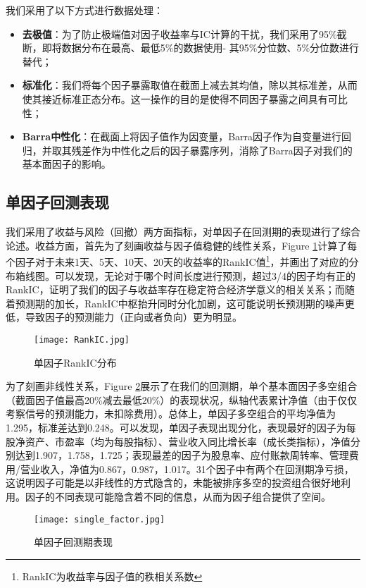 \documentclass[11pt]{article}
\begin{document}
我们采用了以下方式进行数据处理：
\begin{itemize}
    \item \textbf{去极值}：为了防止极端值对因子收益率与IC计算的干扰，我们采用了95\%截断，即将数据分布在最高、最低5\%的数据使用-
    其95\%分位数、5\%分位数进行替代；
    \item \textbf{标准化}：我们将每个因子暴露取值在截面上减去其均值，除以其标准差，从而使其接近标准正态分布。这一操作的目的是使得不同因子暴露之间具有可比性；
    \item \textbf{Barra中性化}：在截面上将因子值作为因变量，Barra因子作为自变量进行回归，并取其残差作为中性化之后的因子暴露序列，消除了Barra因子对我们的基本面因子的影响。
\end{itemize}


\subsection{单因子回测表现}

我们采用了收益与风险（回撤）两方面指标，对单因子在回测期的表现进行了综合论述。收益方面，首先为了刻画收益与因子值稳健的线性关系，Figure \ref{fig:rankic}计算了每个因子对于未来1天、5天、10天、20天的收益率的RankIC值\footnote{RankIC为收益率与因子值的秩相关系数}，并画出了对应的分布箱线图。可以发现，无论对于哪个时间长度进行预测，超过3/4的因子均有正的RankIC，证明了我们的因子与收益率存在稳定符合经济学意义的相关关系；而随着预测期的加长，RankIC中枢抬升同时分化加剧，这可能说明长预测期的噪声更低，导致因子的预测能力（正向或者负向）更为明显。
\begin{figure}[H]
    \centering
    \texttt{[image: RankIC.jpg]}
    \caption{单因子RankIC分布}
    \label{fig:rankic}
\end{figure} 

为了刻画非线性关系，Figure \ref{fig: single}展示了在我们的回测期，单个基本面因子多空组合（截面因子值最高20\%减去最低20\%）的表现状况，纵轴代表累计净值（由于仅仅考察信号的预测能力，未扣除费用）。总体上，单因子多空组合的平均净值为1.295，标准差达到0.248。可以发现，单因子表现出现分化，表现最好的因子为每股净资产、市盈率（均为每股指标）、营业收入同比增长率（成长类指标），净值分别达到1.907，1.758，1.725；表现最差的因子为股息率、应付账款周转率、管理费用/营业收入，净值为0.867，0.987，1.017。31个因子中有两个在回测期净亏损，这说明因子可能是以非线性的方式隐含的，未能被排序多空的投资组合很好地利用。因子的不同表现可能隐含着不同的信息，从而为因子组合提供了空间。

\begin{figure}[H]
    \centering
    \texttt{[image: single\_factor.jpg]}
    \caption{单因子回测期表现}
    \label{fig: single}
\end{figure} 
\end{document}
